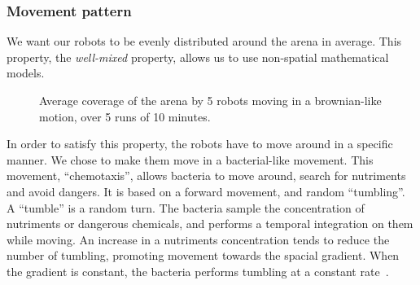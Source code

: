 	\subsubsection{Movement pattern} %
	\label{ssub:movement_pattern}
	We want our robots to be evenly distributed around the arena in average. This property, the \textit{well-mixed} property, allows us to use non-spatial mathematical models.
	
	\begin{figure}[h!]
		\centering
		\; %
		\caption{Average coverage of the arena by 5 robots moving in a brownian-like motion, over 5 runs of 10 minutes.}
	\label{fig:covering_brownian} %
	\end{figure}
	
	In order to satisfy this property, the robots have to move around in a specific manner. We chose to make them move in a bacterial-like movement. This movement, ``chemotaxis'', allows bacteria to move around, search for nutriments and avoid dangers. It is based on a forward movement, and random ``tumbling''. A ``tumble'' is a random turn. The bacteria sample the concentration of nutriments or dangerous chemicals, and performs a temporal integration on them while moving. An increase in a nutriments concentration tends to reduce the number of tumbling, promoting movement towards the spacial gradient. When the gradient is constant, the bacteria performs tumbling at a constant rate~\cite{Berg:2000p10058, Adler:1975p7745, Macnab:1972p7813, Dhariwal:1926p7464}.


